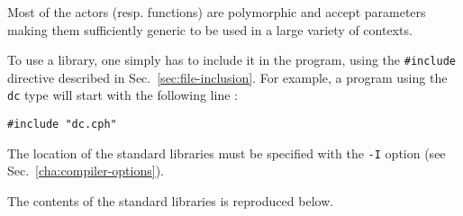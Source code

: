 Most of the actors (resp. functions) are polymorphic and accept parameters making them sufficiently
generic to be used in a large variety of contexts.

To use a library, one simply has to include it in the program, using the \verb|#include| directive
described in Sec.~\ref{sec:file-inclusion}. For example, a program using the \verb|dc| type
will start with the following line :

\begin{lstlisting}
#include "dc.cph"
\end{lstlisting}

The location of the standard libraries must be specified with the \verb|-I| option (see Sec.~\ref{cha:compiler-options}). 

\medskip
The contents of the standard libraries is reproduced below.












